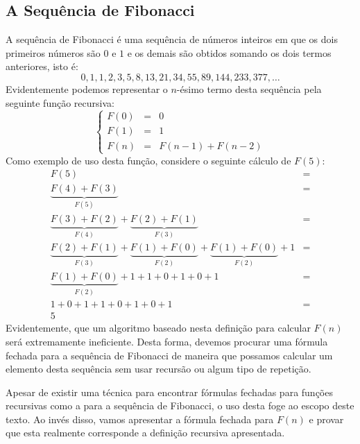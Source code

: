 \subsection{A Sequência de Fibonacci}

A sequência de Fibonacci é uma sequência de números inteiros em que os
dois primeiros números são $0$ e $1$ e os demais são obtidos somando
os dois termos anteriores, isto é:
\[
0,1,1,2,3,5,8,13,21, 34, 55, 89, 144, 233, 377, …
\]
Evidentemente podemos representar o $n$-ésimo termo desta sequência
pela seguinte função recursiva:
\[
\left\{
\begin{array}{lcl}
F(0) & = & 0 \\
F(1) & = & 1 \\
F(n) & = & F(n - 1) + F(n - 2)
\end{array}
\right.
\]
Como exemplo de uso desta função, considere o seguinte cálculo de $F(5)$:
\[
\begin{array}{lc}
F(5) & = \\
\underbrace{F(4) + F(3)}_{F(5)} & = \\
\underbrace{F(3) + F(2)}_{F(4)} + \underbrace{F(2) + F(1)}_{F(3)} & = \\
\underbrace{F(2) + F(1)}_{F(3)} + \underbrace{F(1) + F(0)}_{F(2)} +
\underbrace{F(1) + F(0)}_{F(2)} + 1 & = \\
\underbrace{F(1) + F(0)}_{F(2)} + 1 + 1 + 0 + 1 + 0 + 1& =\\
1 + 0 + 1 + 1 + 0 + 1 + 0 + 1& = \\
5
\end{array}
\]
Evidentemente, que um algoritmo baseado nesta definição para calcular
$F(n)$ será extremamente ineficiente. Desta forma, devemos procurar
uma fórmula fechada para a sequência de Fibonacci de maneira que
possamos calcular um elemento desta sequência sem usar recursão ou
algum tipo de repetição.

Apesar de existir uma técnica para encontrar fórmulas fechadas para
funções recursivas como a para a sequência de Fibonacci, o uso desta
foge ao escopo deste texto. Ao invés disso, vamos apresentar a fórmula
fechada para $F(n)$ e provar que esta realmente corresponde a
definição recursiva apresentada.

